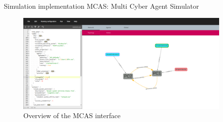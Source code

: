         
        \begin{frame}{Simulation implementation}
            {MCAS: Multi Cyber Agent Simulator}

            \begin{figure}
                \centering
                \includegraphics[width=0.95\textwidth]{figures/interface_MCAS.png}
                \caption{Overview of the MCAS interface}
                \label{fig:interface_simulateur}
            \end{figure}
        
        \end{frame}

        
            

 
